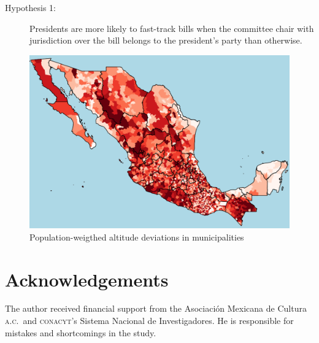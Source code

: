 \documentclass[letter,12pt]{article}
\begin{document}
\begin{description}
  \item [Hypothesis 1:] Presidents are more likely to fast-track bills when the committee chair with jurisdiction over the bill  belongs to the president's party than otherwise.
\end{description}

\begin{figure}
  \centering
    \caption{Population-weigthed altitude deviations in municipalities}\label{F:avgMg}
    \includegraphics[width=.8\columnwidth]{../graph/map.png}
\end{figure}


\section*{Acknowledgements}
The author received financial support from the Asociaci\'on Mexicana de Cultura \textsc{a.c.}\ and \textsc{conacyt}'s Sistema Nacional de Investigadores. He is responsible for mistakes and shortcomings in the study.




\end{document}
